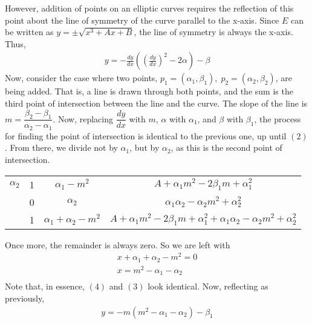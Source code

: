 \documentclass[12pt,letterpaper]{article}
\begin{document}
However, addition of points on an elliptic curves requires the reflection of this point about the line of symmetry of the curve parallel to the x-axis. Since $E$ can be written as $y=\pm\sqrt{x^3+Ax+B}$, the line of symmetry is always the x-axis. Thus,
\begin{align*}
y=-\frac{dy}{dx}\left(\left(\frac{dy}{dx}\right)^2-2\alpha\right)-\beta
\end{align*}
\break
Now, consider the case where two points, $p_1=(\alpha_1,\beta_1),\; p_2=(\alpha_2,\beta_2)$, are being added. That is, a line is drawn through both points, and the sum is the third point of intersection between the line and the curve.
The slope of the line is $m=\dfrac{\beta_2-\beta_1}{\alpha_2-\alpha_1}$. Now, replacing $\dfrac{dy}{dx}$ with $m$, $\alpha$ with $\alpha_1$, and $\beta$ with $\beta_1$, the process for finding the point of intersection is identical to the previous one, up until $(2)$. From there, we divide not by $\alpha_1$, but by $\alpha_2$, as this is the second point of intersection.
\begin{center}
  \begin{tabular} { c | c | c | c }
  $\alpha_2$ & 1 & $\alpha_1-m^2$ & $A+\alpha_1 m^2-2\beta_1 m+\alpha_1^2$ \\ 
  & 0 & $\alpha_2$ & $\alpha_1\alpha_2-\alpha_2 m^2+\alpha_2^2$ \\
  \hline
  & 1 & $\alpha_1+\alpha_2-m^2$ & $A+\alpha_1 m^2-2\beta_1 m + \alpha_1^2+\alpha_1\alpha_2-\alpha_2 m^2+\alpha_2^2$ \\
  \end{tabular}
  \break
\end{center}
Once more, the remainder is always zero. So we are left with
\begin{align*}
x+\alpha_1 + \alpha_2 -m^2=0 \\
x=m^2-\alpha_1 - \alpha_2 \tag{4}\\ 
\end{align*}
Note that, in essence, $(4)$ and $(3)$ look identical.
Now, reflecting as previously,
\begin{align*}
y=-m(m^2-\alpha_1-\alpha_2)-\beta_1
\end{align*}
\end{document}
